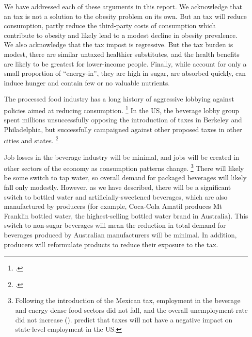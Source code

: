 \documentclass[embargoed]{grattan}
\begin{document}
We have addressed each of these arguments in this report. We acknowledge that an \SSB{} tax is not a solution to the obesity problem on its own.
But an \SSB{} tax will reduce consumption, partly reduce the third-party costs of \SSB{} consumption which contribute to obesity and likely lead to a modest decline in obesity prevalence.
We also acknowledge that the \SSB{} tax impost is regressive.
But the tax burden is modest, there are similar untaxed healthier substitutes, and the health benefits are likely to be greatest for lower-income people.
Finally, while \SSBs{} account for only a small proportion of “energy-in”, they are high in sugar, are absorbed quickly, can induce hunger and contain few or no valuable nutrients.

The processed food industry has a long history of aggressive lobbying against policies aimed at reducing consumption.%
\footcites{Nestle2015Sodapoliticstaking}{Observatory2016spoonfulsugarHow}{Koplan2010Responsefoodbeverage} In the US, the beverage lobby group spent millions unsuccessfully opposing the introduction of \SSB{} taxes in Berkeley and Philadelphia, but successfully campaigned against other proposed \SSB{} taxes in other cities and states.%
\footcites{Nestle2015Sodapoliticstaking}{Nadolny2016Sodataxpasses}{Organization2016FiscalPoliciesDiet}{Steinmetz2014BigSodaFights}{Nadolny2016Sodataxpasses}{Belluz2016UStaxes}


Job losses in the beverage industry will be minimal, and jobs will be created in other sectors of the economy as consumption patterns change.%
\footnote{Following the introduction of the Mexican \SSB{} tax, employment in the beverage and energy-dense food sectors did not fall, and the overall unemployment rate did not increase (\textcite{SaludPublica2016Employmentchangesassociated}). \textcite{Powell2014Employment} predict that \SSB{} taxes will not have a negative impact on state-level employment in the US.} There will likely be some switch to tap water, so overall demand for packaged beverages will likely fall only modestly.
However, as we have described, there will be a significant switch to bottled water and artificially-sweetened beverages, which are also manufactured by \SSB{} producers (for example, Coca-Cola Amatil produces Mt Franklin bottled water, the highest-selling bottled water brand in Australia).
This switch to non-sugar beverages will mean the reduction in total demand for beverages produced by Australian manufacturers will be minimal.
In addition, producers will reformulate products to reduce their exposure to the \SSB{} tax.
\end{document}
